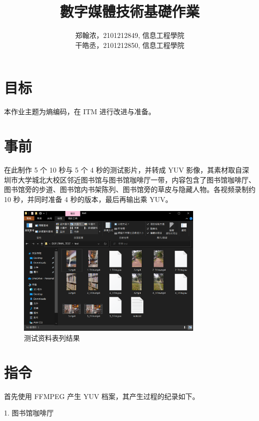 \documentclass[10pt,UTF8]{ctexart}
\title{數字媒體技術基礎作業}
\author{郑翰浓，2101212849, 信息工程學院\\干皓丞，2101212850, 信息工程學院}
\begin{document}
\maketitle


\section{目标}

本作业主题为熵编码，在 ITM 进行改进与准备。

\section{事前}

在此制作 5 个 10 秒与 5 个 4 秒的测试影片，并转成 YUV 影像，其素材取自深圳市大学城北大校区邻近图书馆与图书馆咖啡厅一带，内容包含了图书馆咖啡厅、图书馆旁的步道、图书馆内书架陈列、图书馆旁的草皮与隐藏人物。各视频录制约 10 秒，并同时准备 4 秒的版本，最后再输出乘 YUV。

\begin{figure}[H]
\centering 
\includegraphics[width=0.80\textwidth]{0.png} 
\caption{测试资料表列结果}
\label{Test}
\end{figure}

\section{指令}

首先使用 FFMPEG 产生 YUV 档案，其产生过程的纪录如下。

1. 图书馆咖啡厅
\end{document}
